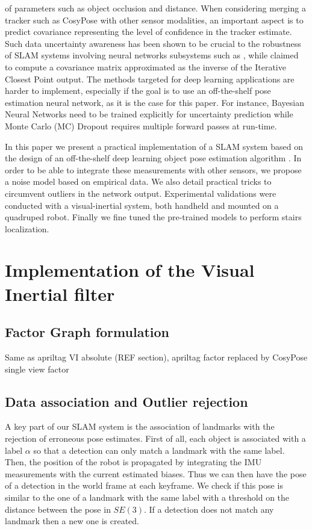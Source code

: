 of parameters such as object occlusion and distance. 
When considering merging a tracker such as CosyPose with other sensor modalities, an important aspect is to predict covariance representing the level of confidence in 
the tracker estimate.
Such data uncertainty awareness has been shown to be crucial to the robustness of SLAM systems involving neural networks subsystems such as \cite{yang2020d3vo}, 
while \cite{SalasMoreno2013SLAMSL} claimed to compute a covariance matrix approximated as the inverse of the Iterative Closest Point output. The methods targeted for 
deep learning applications are harder to implement, especially if the goal is to use an off-the-shelf pose estimation neural network, as it is the case for this paper. 
For instance, Bayesian Neural Networks \cite{jospin2020hands} need to be trained explicitly for uncertainty prediction while Monte Carlo (MC) Dropout \cite{gal2016dropout} 
requires multiple forward passes at run-time.

In this paper we present a practical implementation of a SLAM system based on the design of an off-the-shelf deep learning object pose estimation algorithm \cite{labbe2020cosypose}. 
In order to be able to integrate these measurements with other sensors, we propose a noise model based on empirical data. We also detail practical tricks to circumvent outliers in 
the network output. Experimental validations were conducted with a visual-inertial system, both handheld and mounted on a quadruped robot. Finally we fine tuned the pre-trained models 
to perform stairs localization. 



\section{Implementation of the Visual Inertial filter}

\subsection{Factor Graph formulation}
Same as apriltag VI absolute (REF section), apriltag factor replaced by CosyPose single view factor

\subsection{Data association and Outlier rejection}
A key part of our SLAM system is the association of landmarks with the rejection of erroneous pose estimates. First of all, each object is associated with a 
label $\alpha$ so that a detection can only match a landmark with the same label. Then, the position of the robot is propagated by integrating the IMU measurements 
with the current estimated biases. Thus we can then have the pose of a detection in the world frame at each keyframe. We check if this pose is similar to the one of a 
landmark with the same label with a threshold on the distance between the pose in $SE(3)$. If a detection does not match any landmark then a new one is created.

